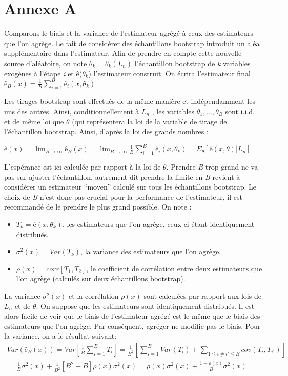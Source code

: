 \chapter{Annexe A\cite{ESL}}
	\begin{footnotesize}

	Comparons le biais et la variance de l’estimateur agrégé à ceux des estimateurs que l’on agrège.
	Le fait de considérer des échantillons bootstrap introduit un aléa supplémentaire dans l’estimateur. Afin de prendre en compte cette nouvelle source d’aléatoire, on note $\theta_k = \theta_k(L_n)$ l’échantillon bootstrap de \textit{k} variables exogènes à l’étape \textit{i} et ê($\theta_k$) l’estimateur construit. On écrira l'estimateur final ${ê_B(x) =  \frac{1}{B} \sum_{i=1}^{B} ê_i(x,\theta_k)}$
	\par
	Les tirages bootstrap sont effectués de la même manière et indépendamment les uns des autres.
	Ainsi, conditionnellement à $L_n$ , les variables $\theta_1,..., \theta_B$ sont i.i.d. et de même loi que $\theta$ (qui représentera la loi de la variable de tirage de l’échantillon bootstrap. Ainsi, d’après la loi des grands nombres :
	\begin{center}
		${ê(x) = \lim_{B \to \infty} ê_B(x) = \lim_{B \to \infty} \frac{1}{B} \sum_{i=1}^{B} ê_i(x,\theta_k) = E_\theta[ê(x,\theta) | L_n]  }$
	\end{center}
	L’espérance est ici calculée par rapport à la loi de $\theta$. Prendre \textit{B} trop grand ne va pas sur-ajuster l’échantillon, autrement dit prendre la limite en \textit{B} revient à considérer un estimateur “moyen” calculé sur tous les échantillons bootstrap. Le choix de \textit{B} n’est donc pas crucial pour la performance de l’estimateur, il est recommandé de le prendre le plus grand possible. On note :
	\begin{itemize}
	\item ${T_k=ê(x,\theta_k)}$, les estimateurs que l'on agrège, ceux ci étant identiquement distribués.
	\item ${\sigma^2(x) = Var (T_k)}$, la variance des estimateurs que l'on agrège.
	\item ${\rho(x) = corr[T_1,T_2]}$, le coefficient de corrélation entre deux estimateurs que l’on agrège (calculés sur deux échantillons bootstrap).
	\end{itemize}
	La variance ${\sigma^2(x)}$ et la corrélation ${\rho(x)}$ sont calculées par rapport aux lois de \textit{$L_n$} et de $\theta$. On suppose que les estimateurs sont identiquement distribués. Il est alors facile de voir que le biais
	de l’estimateur agrégé est le même que le biais des estimateurs que l’on agrège. Par conséquent,
	agréger ne modifie pas le biais. Pour la variance, on a le résultat suivant:
	\begin{equation*}
	\begin{split}	
	Var(ê_B(x)) = Var [ \frac{1}{B} \sum_{i=1}^{B} T_i] = \frac{1}{B^2} [\sum_{i=1}^{B} Var(T_i) + \sum_{1 \leq i \neq i' \leq B} cov(T_i,T_{i'}) ] \\ = \frac{1}{B}\sigma^2(x) + \frac{1}{B^2}[B^2-B]\rho(x)\sigma^2(x) = \rho(x)\sigma^2(x) + \frac{1-\rho(x)}{B}\sigma^2(x)
	\end{split}
	\end{equation*}


\end{footnotesize}
